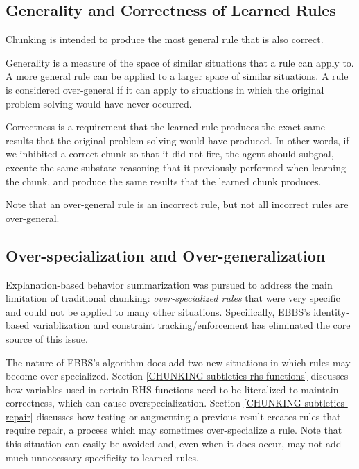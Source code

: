\subsection{Generality and Correctness of Learned Rules}
\label{CHUNKING-subtleties-correctness}

Chunking is intended to produce the most general rule that is also correct.

Generality is a measure of the space of similar situations that a rule can apply to.  A more general rule can be applied to a larger space of similar situations.  A rule is considered over-general if it can apply to situations in which the original problem-solving would have never occurred.

Correctness is a requirement that the learned rule produces the exact same results that the original problem-solving would have produced.  In other words, if we inhibited a correct chunk so that it did not fire, the agent should subgoal, execute the same substate reasoning that it previously performed when learning the chunk, and produce the same results that the learned chunk produces.

Note that an over-general rule is an incorrect rule, but not all incorrect rules are over-general.

\subsection{Over-specialization and Over-generalization}
\label{CHUNKING-subtleties-overspecialization}

Explanation-based behavior summarization was pursued to address the main limitation of traditional chunking:  \textit{over-specialized rules} that were very specific and could not be applied to many other situations. Specifically, EBBS's identity-based variablization and constraint tracking/enforcement has eliminated the core source of this issue.

The nature of EBBS's algorithm does add two new situations in which rules may become over-specialized.  Section \ref{CHUNKING-subtleties-rhs-functions} discusses how variables used in certain RHS functions need to be literalized to maintain correctness, which can cause overspecialization. Section \ref{CHUNKING-subtleties-repair} discusses how testing or augmenting a previous result creates rules that require repair, a process which may sometimes over-specialize a rule.  Note that this situation can easily be avoided and, even when it does occur, may not add much unnecessary specificity to learned rules.

